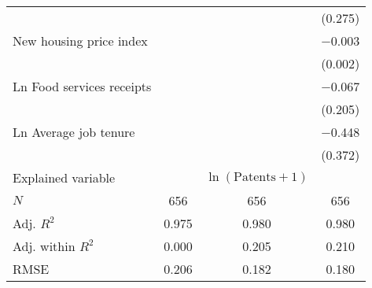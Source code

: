 \begin{tabular}[t]{lccc}
 &  &  & (\num{0.275})\\
New housing price index &  &  & \num{-0.003}\\
 &  &  & (\num{0.002})\\
Ln Food services receipts &  &  & \num{-0.067}\\
 &  &  & (\num{0.205})\\
Ln Average job tenure &  &  & \num{-0.448}\\
 &  &  & (\num{0.372})\\
\midrule
Explained variable &  & $\ln(\text{Patents}+1)$ & \\
$N$ & \num{656} & \num{656} & \num{656}\\
Adj. $R^2$ & \num{0.975} & \num{0.980} & \num{0.980}\\
Adj. within $R^2$ & \num{0.000} & \num{0.205} & \num{0.210}\\
RMSE & \num{0.206} & \num{0.182} & \num{0.180}\\
\bottomrule
\end{tabular}
